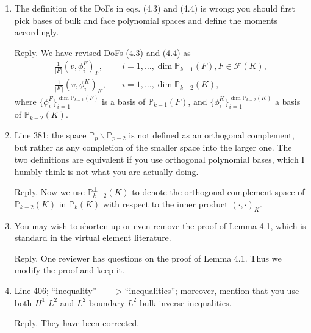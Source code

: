 \documentclass[10pt]{amsart}
\theoremstyle{definition}
\theoremstyle{remark}
\begin{document}
\begin{enumerate}[1.]
\medskip

\item \textsf{The definition of the DoFs in eqs. (4.3) and (4.4) is wrong: you should first pick bases of bulk and face polynomial spaces and define the moments accordingly.}

\smallskip \noindent \textcolor[rgb]{1.00,0.00,0.00}{Reply.}
We have revised DoFs (4.3) and (4.4) as
\begin{align*}
\frac{1}{|F|}(v, \phi_i^F)_F, & \quad i=1,\ldots, \dim\mathbb P_{k-1}(F), F\in\mathcal F(K), 
\\
\frac{1}{|K|}(v, \phi_i^K)_K, & \quad i=1,\ldots, \dim\mathbb P_{k-2}(K),
\end{align*}
where $\{\phi_i^F\}_{i=1}^{\dim\mathbb P_{k-1}(F)}$ is a basis of $\mathbb P_{k-1}(F)$, and $\{\phi_i^K\}_{i=1}^{\dim\mathbb P_{k-2}(K)}$ a basis of $\mathbb P_{k-2}(K)$.

\medskip

\item \textsf{Line 381; the space $\mathbb P_p\backslash\mathbb P_{p-2}$ is not defined as an orthogonal complement, but rather as any completion of the smaller space into the larger one. The two definitions are equivalent if you use orthogonal polynomial bases, which I humbly think is not what you are actually doing.}

\smallskip \noindent \textcolor[rgb]{1.00,0.00,0.00}{Reply.}
Now we use $\mathbb P_{k-2}^{\perp}(K)$ to denote the orthogonal complement space of $\mathbb P_{k-2}(K)$ in $\mathbb P_{k}(K)$ with respect to the inner product $(\cdot, \cdot)_K$.

\medskip

\item \textsf{You may wish to shorten up or even remove the proof of Lemma 4.1, which is standard in the virtual element literature.}

\smallskip \noindent \textcolor[rgb]{1.00,0.00,0.00}{Reply.}
One reviewer has questions on the proof of Lemma 4.1. Thus we modify the proof and keep it.

\medskip

\item \textsf{Line 406; “inequality”$-\!\!\!-\!\!\!>$“inequalities”; moreover, mention that you use both $H^1$-$L^2$ and $L^2$ boundary-$L^2$ bulk inverse inequalities.}

\smallskip \noindent \textcolor[rgb]{1.00,0.00,0.00}{Reply.}
They have been corrected.

\medskip


\end{enumerate}
\end{document}
